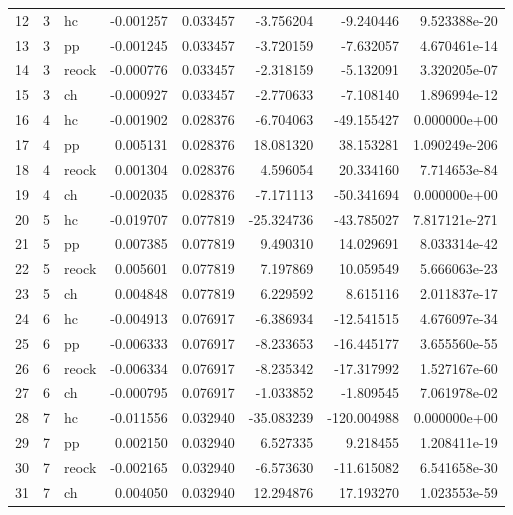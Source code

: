 \documentclass[]{article}
\begin{document}
\begin{tabular}{lrlrrrrr}
12 &      3 &     hc &  -0.001257 &  0.033457 &     -3.756204 &   -9.240446 &   9.523388e-20 \\
13 &      3 &     pp &  -0.001245 &  0.033457 &     -3.720159 &   -7.632057 &   4.670461e-14 \\
14 &      3 &  reock &  -0.000776 &  0.033457 &     -2.318159 &   -5.132091 &   3.320205e-07 \\
15 &      3 &     ch &  -0.000927 &  0.033457 &     -2.770633 &   -7.108140 &   1.896994e-12 \\
16 &      4 &     hc &  -0.001902 &  0.028376 &     -6.704063 &  -49.155427 &   0.000000e+00 \\
17 &      4 &     pp &   0.005131 &  0.028376 &     18.081320 &   38.153281 &  1.090249e-206 \\
18 &      4 &  reock &   0.001304 &  0.028376 &      4.596054 &   20.334160 &   7.714653e-84 \\
19 &      4 &     ch &  -0.002035 &  0.028376 &     -7.171113 &  -50.341694 &   0.000000e+00 \\
20 &      5 &     hc &  -0.019707 &  0.077819 &    -25.324736 &  -43.785027 &  7.817121e-271 \\
21 &      5 &     pp &   0.007385 &  0.077819 &      9.490310 &   14.029691 &   8.033314e-42 \\
22 &      5 &  reock &   0.005601 &  0.077819 &      7.197869 &   10.059549 &   5.666063e-23 \\
23 &      5 &     ch &   0.004848 &  0.077819 &      6.229592 &    8.615116 &   2.011837e-17 \\
24 &      6 &     hc &  -0.004913 &  0.076917 &     -6.386934 &  -12.541515 &   4.676097e-34 \\
25 &      6 &     pp &  -0.006333 &  0.076917 &     -8.233653 &  -16.445177 &   3.655560e-55 \\
26 &      6 &  reock &  -0.006334 &  0.076917 &     -8.235342 &  -17.317992 &   1.527167e-60 \\
27 &      6 &     ch &  -0.000795 &  0.076917 &     -1.033852 &   -1.809545 &   7.061978e-02 \\
28 &      7 &     hc &  -0.011556 &  0.032940 &    -35.083239 & -120.004988 &   0.000000e+00 \\
29 &      7 &     pp &   0.002150 &  0.032940 &      6.527335 &    9.218455 &   1.208411e-19 \\
30 &      7 &  reock &  -0.002165 &  0.032940 &     -6.573630 &  -11.615082 &   6.541658e-30 \\
31 &      7 &     ch &   0.004050 &  0.032940 &     12.294876 &   17.193270 &   1.023553e-59 \\

\end{tabular}
\end{document}
